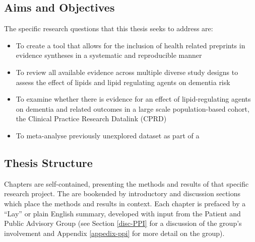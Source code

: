 \documentclass[a4paper, twoside]{templates/ociamthesis}
\providecommand{\tightlist}{%
  \setlength{\itemsep}{0pt}\setlength{\parskip}{0pt}}
\begin{document}
\hypertarget{aims-and-objectives}{%
\subsection{Aims and Objectives}\label{aims-and-objectives}}

The specific research questions that this thesis seeks to address are:

\begin{itemize}
\tightlist
\item
  To create a tool that allows for the inclusion of health related preprints in evidence syntheses in a systematic and reproducible manner
\item
  To review all available evidence across multiple diverse study designs to assess the effect of lipids and lipid regulating agents on dementia risk
\item
  To examine whether there is evidence for an effect of lipid-regulating agents on dementia and related outcomes in a large scale population-based cohort, the Clinical Practice Research Datalink (CPRD)
\item
  To meta-analyse previously unexplored dataset as part of a
\end{itemize}

\hypertarget{thesis-structure}{%
\subsection{Thesis Structure}\label{thesis-structure}}

Chapters are self-contained, presenting the methods and results of that specific research project. The are bookended by introductory and discussion sections which place the methods and results in context. Each chapter is prefaced by a ``Lay'' or plain English summary, developed with input from the Patient and Public Advisory Group (see Section \ref{disc-PPI} for a discussion of the group's involvement and Appendix \ref{appedix-ppi} for more detail on the group).
\end{document}
